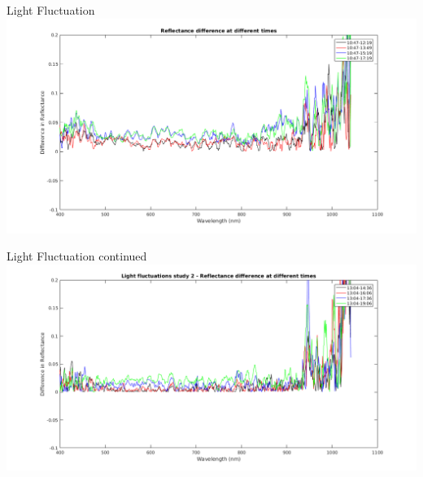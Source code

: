 \documentclass[10pt]{beamer}
\begin{document}
\begin{frame}{Light Fluctuation}
\centering
\includegraphics[width=\textwidth]{lightfluct1abs.png}
\end{frame}
\begin{frame}{Light Fluctuation continued}
\includegraphics[width=\textwidth]{lightfluct2abs.png}
\end{frame}
\end{document}

